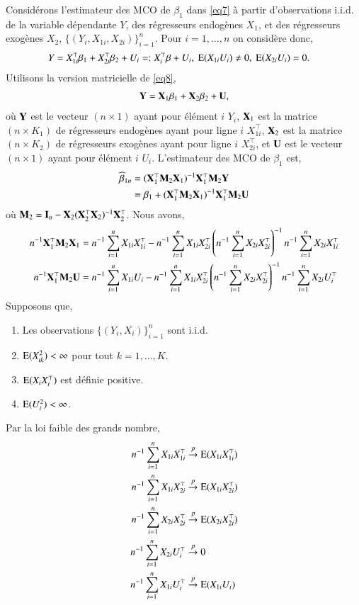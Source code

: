\documentclass[10pt, reqno]{amsart}
\begin{document}
 Considérons l'estimateur des MCO de $\beta_1$ dans \eqref{eq7} à partir d'observations i.i.d. de la variable dépendante $Y$,
 des régresseurs endogènes $X_1$, et des régresseurs exogènes $X_2$, $\{(Y_i, X_{1i}, X_{2i})\}_{i=1}^n$. 
 Pour $i=1, \ldots, n$ on considère donc,
\begin{align}
	Y &= X_{1i}^\top\beta_1 + X_{2i}^\top\beta_2 + U_i =: X_i^\top\beta + U_i, \ \operatorname{E}(X_{1i}U_i) \neq 0, \ \operatorname{E}(X_{2i}U_i) = 0.
	\label{eq8}
 \end{align}
 Utilisons la version matricielle de \eqref{eq8},
\begin{align*}
	\mathbf Y = \mathbf X_1\beta_1 + \mathbf X_2\beta_2 + \mathbf U,
	\end{align*}
	où $\mathbf Y$ est le vecteur $(n\times 1)$ ayant pour élément $i$ $Y_i$, $\mathbf X_1$ est la matrice $(n\times K_1)$ de régresseurs endogènes ayant pour ligne $i$ $X_{1i}^\top$, $\mathbf X_2$ est la matrice $(n\times K_2)$ de régresseurs exogènes ayant pour ligne $i$ $X_{2i}^\top$, et $\mathbf U$ est le vecteur $(n\times 1)$ ayant pour élément $i$ $U_i$. L'estimateur des MCO de $\beta_1$ est,
	\begin{align*}
	\widehat{\beta}_{1n} &= (\mathbf X_1^\top\mathbf M_2\mathbf X_1)^{-1}\mathbf X_1^\top\mathbf M_2\mathbf Y \\
	&=\beta_1 +(\mathbf X_1^\top\mathbf M_2\mathbf X_1)^{-1}\mathbf X_1^\top\mathbf M_2\mathbf U
	\end{align*}
	où $\mathbf M_2 = \mathbf{I}_n - \mathbf X_2(\mathbf X_2^\top\mathbf X_2)^{-1}\mathbf X_2^\top$. Nous avons,
	\begin{align*}
	n^{-1}\mathbf X_1^\top\mathbf M_2\mathbf X_1 &= n^{-1}\sum_{i=1}^n X_{1i}X_{1i}^\top - n^{-1}\sum_{i=1}^n X_{1i}X_{2i}^\top\left(n^{-1}\sum_{i=1}^n X_{2i}X_{2i}^\top\right)^{-1} n^{-1}\sum_{i=1}^n X_{2i}X_{1i}^\top\\
	n^{-1}\mathbf X_1^\top\mathbf M_2\mathbf U &= n^{-1}\sum_{i=1}^n X_{1i}U_i - n^{-1}\sum_{i=1}^n X_{1i}X_{2i}^\top\left(n^{-1}\sum_{i=1}^n X_{2i}X_{2i}^\top\right)^{-1} n^{-1}\sum_{i=1}^n X_{2i}U_i^\top
	\end{align*}
	Supposons que,
	\begin{enumerate}[label = (A.\arabic*)]
	\item Les observations $\{(Y_i, X_i)\}_{i=1}^n$ sont i.i.d.
	\item $\operatorname{E}(X_{ik}^2) < \infty$ pour tout $k=1,...,K$.
	\item $\operatorname{E}(X_iX_i^\top)$ est définie positive.
	\item $\operatorname{E}(U_i^2) < \infty$.
	\end{enumerate}
	Par la loi faible des grands nombre,
	\begin{align*}
	n^{-1}\sum_{i=1}^n X_{1i}X_{1i}^\top &\overset{p}{\rightarrow} \operatorname{E}(X_{1i}X_{1i}^\top)\\
	n^{-1}\sum_{i=1}^n X_{1i}X_{2i}^\top &\overset{p}{\rightarrow} \operatorname{E}(X_{1i}X_{2i}^\top)\\
	n^{-1}\sum_{i=1}^n X_{2i}X_{2i}^\top &\overset{p}{\rightarrow} \operatorname{E}(X_{2i}X_{2i}^\top)\\
	n^{-1}\sum_{i=1}^n X_{2i}U_i^\top &\overset{p}{\rightarrow} 0\\
	n^{-1}\sum_{i=1}^n X_{1i}U_i^\top &\overset{p}{\rightarrow} \operatorname{E}(X_{1i}U_i)
	\end{align*}
\end{document}

